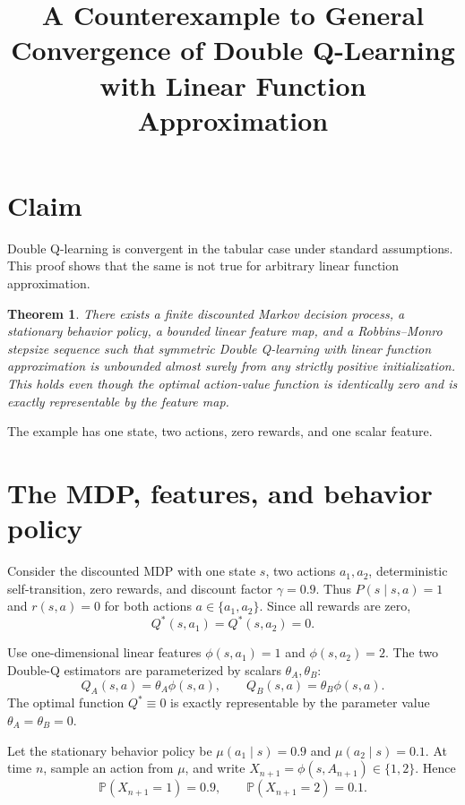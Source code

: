 \documentclass[11pt]{article}
\title{A Counterexample to General Convergence of Double Q-Learning with Linear Function Approximation}
\author{}
\date{}
\newtheorem{theorem}{Theorem}
\begin{document}
\maketitle

\section{Claim}

Double Q-learning is convergent in the tabular case under standard assumptions. This proof shows that the same is not true for arbitrary linear function approximation.

\begin{theorem}
There exists a finite discounted Markov decision process, a stationary behavior policy, a bounded linear feature map, and a Robbins--Monro stepsize sequence such that symmetric Double Q-learning with linear function approximation is unbounded almost surely from any strictly positive initialization. This holds even though the optimal action-value function is identically zero and is exactly representable by the feature map.
\end{theorem}

The example has one state, two actions, zero rewards, and one scalar feature.

\section{The MDP, features, and behavior policy}

Consider the discounted MDP with one state $s$, two actions $a_1, a_2$, deterministic self-transition, zero rewards, and discount factor $\gamma = 0.9$. Thus $P(s \mid s,a) = 1$ and $r(s,a) = 0$ for both actions $a \in \{a_1, a_2\}$. Since all rewards are zero,
\begin{equation}\label{eq:qstar}
Q^*(s,a_1) = Q^*(s,a_2) = 0.
\end{equation}

Use one-dimensional linear features $\phi(s,a_1) = 1$ and $\phi(s,a_2) = 2$. The two Double-Q estimators are parameterized by scalars $\theta_A, \theta_B$:
\begin{equation}\label{eq:qa-qb}
Q_A(s,a) = \theta_A \phi(s,a), \qquad Q_B(s,a) = \theta_B \phi(s,a).
\end{equation}
The optimal function $Q^* \equiv 0$ is exactly representable by the parameter value $\theta_A = \theta_B = 0$.

Let the stationary behavior policy be $\mu(a_1 \mid s) = 0.9$ and $\mu(a_2 \mid s) = 0.1$. At time $n$, sample an action from $\mu$, and write $X_{n+1} = \phi(s, A_{n+1}) \in \{1, 2\}$. Hence
\begin{equation}\label{eq:feature-dist}
\mathbb{P}(X_{n+1} = 1) = 0.9, \qquad \mathbb{P}(X_{n+1} = 2) = 0.1.
\end{equation}
\end{document}
